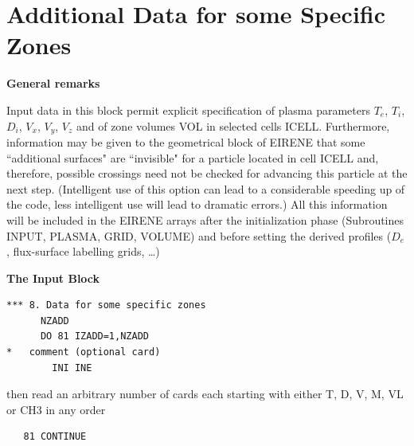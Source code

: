 \section{Additional Data for some Specific Zones} \label{sec2.8}

\textbf{General remarks} 

\medskip 

Input data in this block permit explicit specification of plasma parameters
$T_e$, $T_i$, $D_i$, $V_x$, $V_y$, $V_z$ and of zone volumes VOL in selected
cells ICELL.
Furthermore, information may be given to the geometrical block of EIRENE that
some ``additional surfaces" are ``invisible" for a particle located in cell
ICELL and, therefore, possible crossings need not be checked for advancing this
particle at the next step.
(Intelligent use of this option can lead to a considerable speeding up of the
code, less intelligent use will lead to dramatic errors.)
All this information will be included in the EIRENE arrays after the
initialization phase (Subroutines INPUT, PLASMA, GRID, VOLUME) and before
setting the derived profiles ($D_e$, flux-surface labelling grids, \dots)

\medskip 

\textbf{The Input Block} 

\begin{lstlisting}
*** 8. Data for some specific zones
      NZADD
      DO 81 IZADD=1,NZADD
*   comment (optional card)
        INI INE
\end{lstlisting} 

then read an arbitrary number of cards each starting with either T, D, V, M, VL
or CH3 in any order 

\begin{lstlisting}
   81 CONTINUE
\end{lstlisting} 

